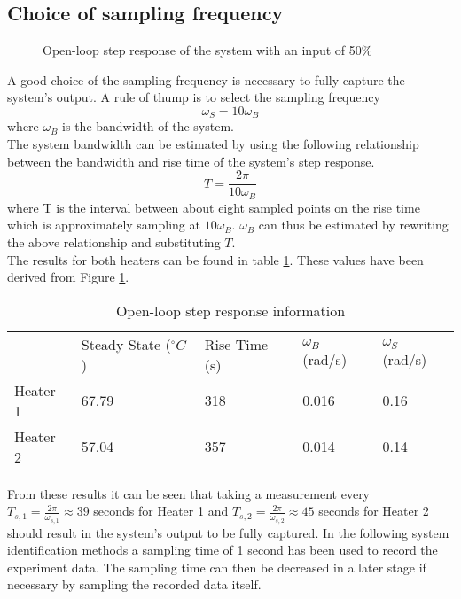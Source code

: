 \subsection{Choice of sampling frequency}

\begin{figure}[ht]
    \centering
    
    \caption{Open-loop step response of the system with an input of 50\%}
    \label{fig:stepResponse1}
\end{figure}

A good choice of the sampling frequency is necessary to fully capture the system's output.
A rule of thump is to select the sampling frequency 
$$
\omega_S = 10\omega_B
$$
where $\omega_B$ is the bandwidth of the system. \\

\noindent The system bandwidth can be estimated by using the following relationship between the bandwidth and rise time of the system's step response.
$$
 T = \frac{2\pi}{10\omega_B}
$$
where T is the interval between about eight sampled points on the rise time which is approximately sampling at $10\omega_B$. $\omega_B$ can thus be estimated by rewriting the above relationship and substituting $T$. \\

\noindent The results for both heaters can be found in table \ref{Tab:stepInfo}. These values have been derived from Figure \ref{fig:stepResponse1}.

\begin{table}[ht]
\centering
\caption{Open-loop step response information}
\begin{tabular}{lllll}
 & Steady State ($^{\circ}C$) & Rise Time (s) & $\omega_B$ (rad/s) & $\omega_S$ (rad/s) \\ \cline{2-5} 
Heater 1 & 67.79 & 318 & 0.016 & 0.16 \\
Heater 2 & 57.04 & 357 & 0.014 & 0.14
\end{tabular}
\label{Tab:stepInfo}
\end{table}
From these results it can be seen that taking a measurement every $T_{s,1} = \frac{2\pi}{\omega_{s,1}} \approx 39$ seconds for Heater 1 and $T_{s,2} = \frac{2\pi}{\omega_{s,2}} \approx 45$ seconds for Heater 2 should result in the system's output to be fully captured. In the following system identification methods a sampling time of 1 second has been used to record the experiment data. The sampling time can then be decreased in a later stage if necessary by sampling the recorded data itself. 